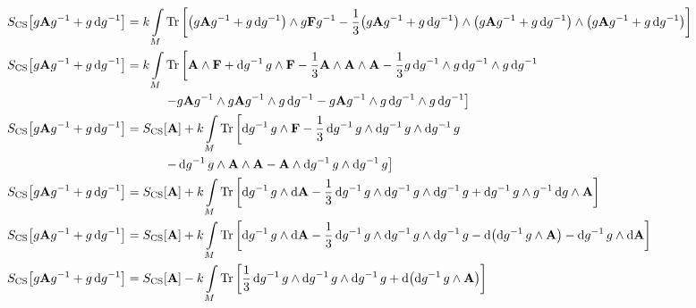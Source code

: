 \begin{align*}
    S_{\textnormal{CS}}\qty[g\vb Ag^{-1}+g\dd{g^{-1}}]&=k\int\limits_M\Tr\qty[\qty(g\vb Ag^{-1}+g\dd{g^{-1}})\wedge g \vb Fg^{-1}-\frac13\qty(g\vb Ag^{-1}+g\dd{g^{-1}})\wedge\qty(g\vb Ag^{-1}+g\dd{g^{-1}})\wedge\qty(g\vb Ag^{-1}+g\dd{g^{-1}})]\\
    S_{\textnormal{CS}}\qty[g\vb Ag^{-1}+g\dd{g^{-1}}]&=k\int\limits_M\Tr\left[\vb A\wedge\vb F+\dd{g^{-1}}g\wedge \vb F-\frac13\vb A\wedge\vb A\wedge\vb A-\frac13g\dd{g^{-1}}\wedge g\dd{g^{-1}}\wedge g\dd{g^{-1}}\right.\\
    &\quad\quad\quad\left.-g\vb Ag^{-1}\wedge g\vb Ag^{-1}\wedge g\dd{g^{-1}}-g\vb A g^{-1}\wedge g\dd{g^{-1}}\wedge g\dd{g^{-1}}\right]\\
    S_{\textnormal{CS}}\qty[g\vb Ag^{-1}+g\dd{g^{-1}}]&=S_{\textnormal{CS}}\qty[\vb A]+k\int\limits_M\Tr\left[\dd{g^{-1}}g\wedge \vb F-\frac13\dd{g^{-1}}g\wedge \dd{g^{-1}}g\wedge \dd{g^{-1}}g\right.\\
    &\quad\quad\quad\left.-\dd{g^{-1}}g\wedge\vb A\wedge \vb A-\vb A \wedge \dd{g^{-1}}g\wedge \dd{g^{-1}}g\right]\\
    S_{\textnormal{CS}}\qty[g\vb Ag^{-1}+g\dd{g^{-1}}]&=S_{\textnormal{CS}}\qty[\vb A]+k\int\limits_M\Tr\left[\dd{g^{-1}}g\wedge \dd{\vb A}-\frac13\dd{g^{-1}}g\wedge \dd{g^{-1}}g\wedge \dd{g^{-1}}g+\dd{g^{-1}}g\wedge g^{-1}\dd{g}\wedge\vb A \right]\\
    S_{\textnormal{CS}}\qty[g\vb Ag^{-1}+g\dd{g^{-1}}]&=S_{\textnormal{CS}}\qty[\vb A]+k\int\limits_M\Tr\left[\dd{g^{-1}}g\wedge \dd{\vb A}-\frac13\dd{g^{-1}}g\wedge \dd{g^{-1}}g\wedge \dd{g^{-1}}g-\dd{\qty(\dd{g^{-1}}g\wedge\vb A )}-\dd{g^{-1}}g\wedge\dd{\vb A}\right]\\
    S_{\textnormal{CS}}\qty[g\vb Ag^{-1}+g\dd{g^{-1}}]&=S_{\textnormal{CS}}\qty[\vb A]-k\int\limits_M\Tr\left[\frac13\dd{g^{-1}}g\wedge \dd{g^{-1}}g\wedge \dd{g^{-1}}g+\dd{\qty(\dd{g^{-1}}g\wedge\vb A )}\right]
\end{align*}